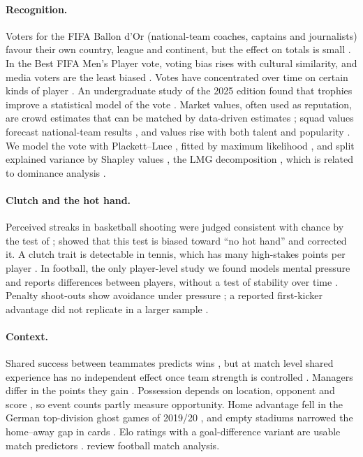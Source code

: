 \documentclass[11pt,a4paper]{article}
\begin{document}
\paragraph{Recognition.}
Voters for the FIFA Ballon d'Or (national-team coaches, captains and
journalists) favour their own country, league and continent, but the effect on
totals is small \citep{coupe2018ballondor}. In the Best FIFA Men's Player vote,
voting bias rises with cultural similarity, and media voters are the least
biased \citep{johnson2022voting}. Votes have concentrated over time on certain kinds
of player \citep{anderson2020celebrity}. An undergraduate study of the 2025
edition found that trophies improve a statistical model of the vote
\citep{olmeta2026ballondor}. Market values, often used as reputation, are crowd
estimates \citep{herm2014crowd} that can be matched by data-driven estimates
\citep{muller2017market}; squad values forecast national-team results
\citep{peeters2018wisdom}, and values rise with both talent and popularity
\citep{franck2012superstar}. We model the vote with Plackett--Luce
\citep{plackett1975permutations,luce1959choice}, fitted by maximum likelihood
\citep{hunter2004mm}, and split explained variance by Shapley values
\citep{shapley1953value}, the LMG decomposition
\citep{lindeman1980multivariate,gromping2007relimp,gromping2006relaimpo}, which
is related to dominance analysis \citep{budescu1993dominance}.

\paragraph{Clutch and the hot hand.}
Perceived streaks in basketball shooting were judged consistent with chance
by the test of \citet{gilovich1985hothand}; \citet{miller2018hothand} showed
that this test is biased toward ``no hot hand'' and corrected it. A clutch trait is detectable
in tennis, which has many high-stakes points per player
\citep{gonzalezdiaz2012tennis}. In football, the only player-level study we
found models mental pressure and reports differences between players, without
a test of stability over time \citep{bransen2019choke}. Penalty shoot-outs
show avoidance under pressure \citep{jordet2008avoidance}; a reported
first-kicker advantage \citep{apesteguia2010pressure} did not replicate in a
larger sample \citep{kocher2012pressure}.

\paragraph{Context.}
Shared success between teammates predicts wins \citep{mukherjee2019shared},
but at match level shared experience has no independent effect once team
strength is controlled \citep{lecoz2025shared}. Managers differ in the points
they gain \citep{muehlheusser2018managers}. Possession depends on location,
opponent and score \citep{lago2009possession}, so event counts partly measure
opportunity. Home advantage fell in the German top-division ghost games of
2019/20 \citep{fischer2021ghost}, and empty stadiums narrowed the home--away
gap in cards \citep{bryson2021crowd}. Elo ratings
\citep{elo1978rating} with a goal-difference variant are usable match
predictors \citep{hvattum2010elo}. \citet{sarmento2018review} review football
match analysis.
\end{document}
